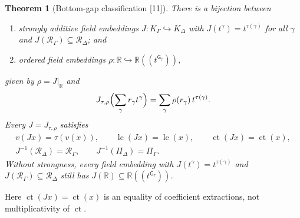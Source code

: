 \documentclass[11pt,oneside]{article}
\numberwithin{equation}{section}
\newtheorem{theorem}{Theorem}[section]
\theoremstyle{definition}
\theoremstyle{remark}
\newcommand{\R}{\mathbb R}
\newcommand{\lc}{\operatorname{lc}}
\newcommand{\ct}{\operatorname{ct}}
\newcommand{\Hahn}[2]{#1((t^{#2}))}
\newcommand{\src}[1]{\textup{\textsf{\small[#1]}}}
\newcommand{\gap}{\mathsf G}
\begin{document}
\begin{theorem}[Bottom-gap classification \src{11}]\label{opa:as:thm:classification}
There is a bijection between
\begin{enumerate}[label=\textup{(\roman*)},itemsep=1pt]
\item strongly additive field embeddings $J:K_\Gamma\hookrightarrow K_\Delta$ with
$J(t^\gamma)=t^{\tau(\gamma)}$ for all $\gamma$ and $J(\mathcal R_\Gamma)\subseteq\mathcal R_\Delta$;
and
\item ordered field embeddings $\rho:\R\hookrightarrow\Hahn\R{\gap_\tau}$,
\end{enumerate}
given by $\rho=J|_\R$ and
\begin{equation}\label{opa:as:eq:classification}
 J_{\tau,\rho}\Bigl(\sum_\gamma r_\gamma t^\gamma\Bigr)=\sum_\gamma\rho(r_\gamma)\,t^{\tau(\gamma)} .
\end{equation}
Every $J=J_{\tau,\rho}$ satisfies
\begin{equation}\label{opa:as:eq:classprops}
 \begin{gathered}
 v(Jx)=\tau(v(x)),\qquad \lc(Jx)=\lc(x),\qquad \ct(Jx)=\ct(x),\\
 J^{-1}(\mathcal R_\Delta)=\mathcal R_\Gamma,\qquad J^{-1}(\Pi_\Delta)=\Pi_\Gamma .
 \end{gathered}
\end{equation}
Without strongness, every field embedding with $J(t^\gamma)=t^{\tau(\gamma)}$ and
$J(\mathcal R_\Gamma)\subseteq\mathcal R_\Delta$ still has $J(\R)\subseteq\Hahn\R{\gap_\tau}$.
\end{theorem}
Here $\ct(Jx)=\ct(x)$ is an equality of coefficient extractions, not multiplicativity of $\ct$.
\end{document}
